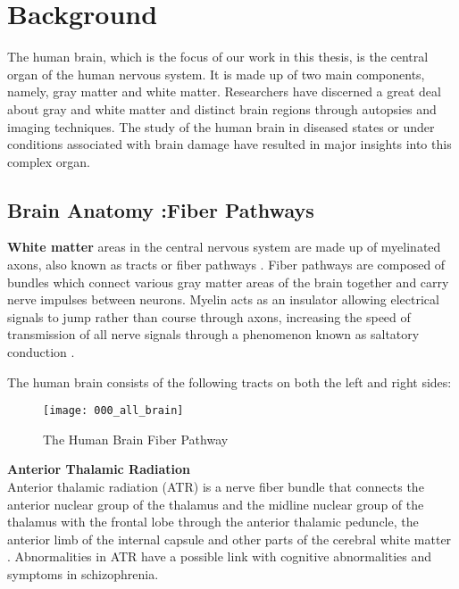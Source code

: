 \documentclass[../structure.tex]{subfiles}
\begin{document}
\chapter{Background}
The human brain, which is the focus of our work in this thesis, is the central organ of the human nervous system. It is made up of two main components, namely, gray matter and white matter. Researchers have discerned a great deal about gray and white matter and distinct brain regions through autopsies and imaging techniques. The study of the human brain in diseased states or under conditions associated with brain damage have resulted in major insights into this complex organ.

\section{Brain Anatomy :Fiber Pathways}
	 \textbf{White matter} areas in the central nervous system are made up of myelinated axons, also known as tracts or fiber pathways \cite{Blumenfeld2010}. Fiber pathways are composed of bundles which connect various gray matter areas of the brain together and carry nerve impulses between neurons. Myelin acts as an insulator allowing electrical signals to jump rather than course through axons, increasing the speed of transmission of all nerve signals through a phenomenon known as saltatory conduction \cite{Klein2008}.
	
	The human brain consists of the following tracts on both the left and right sides:


	\begin{figure}[h!]
	\centering
	\texttt{[image: 000\_all\_brain]}
	\captionsetup{justification=centering}
	\caption{The Human Brain Fiber Pathway}
	\label{fig:all_brain}
	\end{figure}
	
	\textbf{Anterior Thalamic Radiation} \\
	Anterior thalamic radiation (ATR) is a nerve fiber bundle that connects the anterior nuclear group of the thalamus and the midline nuclear group of the thalamus with the frontal lobe through the anterior thalamic peduncle, the anterior limb of the internal capsule and other parts of the cerebral white matter \cite{Washington1994}\cite{Grimm2018}. Abnormalities in ATR have a possible link with cognitive abnormalities and symptoms in schizophrenia\cite{Mamah2010}.	\\
		
\end{document}
